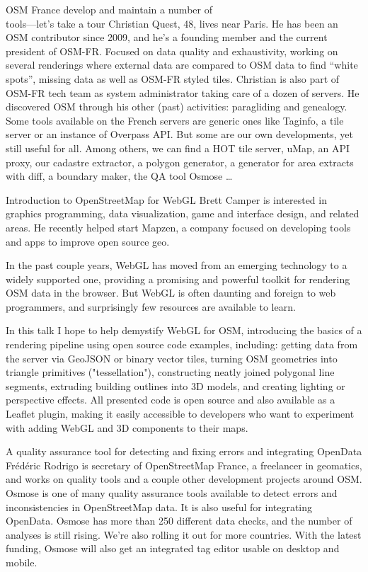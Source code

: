 %
{OSM France develop and maintain a number of\\ tools---let's take a tour}%
{Christian Quest, 48, lives near Paris. He has been an OSM contributor
since 2009, and he's a founding member and the current president of
OSM-FR. Focused on data quality and exhaustivity, working on several
renderings where external data are compared to OSM data to find ``white
spots'', missing data as well as OSM-FR styled tiles. Christian is also
part of OSM-FR tech team as system administrator taking care of a dozen
of servers. He discovered OSM through his other (past) activities:
paragliding and genealogy.}%
{Some tools available on the French servers are generic ones like Taginfo, a tile server or an instance of Overpass API. But some are our own developments, yet still useful for all. Among others, we can find a HOT tile server, uMap, an API proxy, our cadastre extractor, a polygon generator, a generator for area extracts with diff, a boundary maker, the QA tool Osmose \dots}



%
{Introduction to OpenStreetMap for WebGL}%
{Brett Camper is interested in graphics programming, data visualization, game and interface design, and related areas. He recently helped start Mapzen, a company focused on developing tools and apps to improve open source geo.}%
{In the past couple years, WebGL has moved from an emerging technology to a widely supported one, providing a promising and powerful toolkit for rendering OSM data in the browser. But WebGL is often daunting and foreign to web programmers, and surprisingly few resources are available to learn.

In this talk I hope to help demystify WebGL for OSM, introducing the basics of a rendering pipeline using open source code examples, including: getting data from the server via GeoJSON or binary vector tiles, turning OSM geometries into triangle primitives ("tessellation"), constructing neatly joined polygonal line segments, extruding building outlines into 3D models, and creating lighting or perspective effects. All presented code is open source and also available as a Leaflet plugin, making it easily accessible to developers who want to experiment with adding WebGL and 3D components to their maps.}


%
{A quality assurance tool for detecting and fixing errors and integrating OpenData}%
{Frédéric Rodrigo is secretary of OpenStreetMap France, a freelancer in geomatics, and works on quality tools and a couple other development projects around OSM.}%
{Osmose is one of many quality assurance tools available to detect errors and inconsistencies in OpenStreetMap data. It is also useful for integrating OpenData. Osmose has more than 250 different data checks, and the number of analyses is still rising. We're also rolling it out for more countries. With the latest funding, Osmose will also get an integrated tag editor usable on desktop and mobile.}

